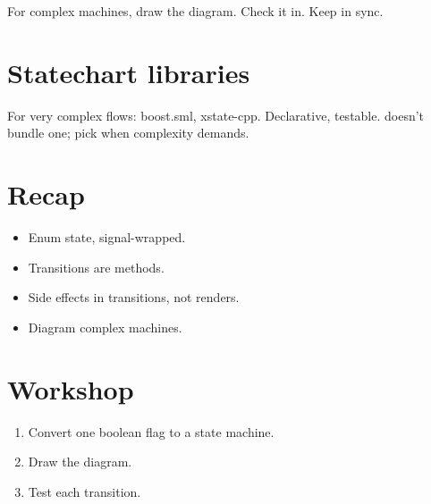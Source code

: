 For complex machines, draw the diagram. Check it in. Keep
in sync.

\section{Statechart libraries}

For very complex flows: boost.sml, xstate-cpp. Declarative,
testable. \maya{} doesn't bundle one; pick when complexity
demands.

\section{Recap}

\begin{recap}
\begin{itemize}[leftmargin=*]
  \item Enum state, signal-wrapped.
  \item Transitions are methods.
  \item Side effects in transitions, not renders.
  \item Diagram complex machines.
\end{itemize}
\end{recap}

\section*{Workshop}

\begin{enumerate}[leftmargin=*]
  \item Convert one boolean flag to a state machine.
  \item Draw the diagram.
  \item Test each transition.
\end{enumerate}
